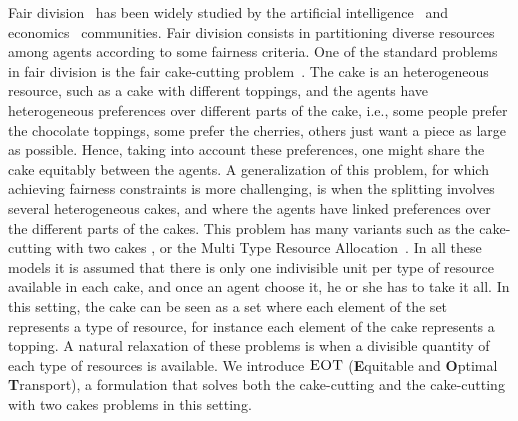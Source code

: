 Fair division~\citep{steinhaus1949fair} has been widely studied by the artificial intelligence~\citep{lattimore2015linear} and economics~\citep{moulin2004fair} communities. Fair division consists in partitioning diverse resources among agents according to some fairness criteria. One of the standard problems in fair division is the fair cake-cutting problem~\citep{dubins1961cut,brandt2016handbook}. The cake is an heterogeneous resource, such as a cake with different toppings, and the agents have heterogeneous preferences over different parts of the cake, i.e., some people prefer the chocolate toppings, some prefer the cherries, others just want a piece as large as possible. Hence, taking into account these preferences, one might share the cake equitably between the agents. A generalization of this problem, for which achieving fairness constraints is more challenging, is when the splitting involves several heterogeneous cakes, and where the agents have linked preferences over the different parts of the cakes. This problem has many variants such as the cake-cutting with two cakes \citep{cloutier2010two}, or the Multi Type Resource Allocation~\citep{mackin2015allocating,wang2019multi}. In all these models it is assumed that there is only one indivisible unit per type of resource available in each cake, and once an agent choose it, he or she has to take it all. In this setting, the cake can be seen as a set where each element of the set represents a type of resource, for instance each element of the cake represents a topping. A natural relaxation of these problems is when a divisible quantity of each type of resources is available.
We introduce $\textsc{EOT}$ (\textbf{E}quitable and \textbf{O}ptimal \textbf{T}ransport), a formulation that solves
both the cake-cutting and the cake-cutting with two cakes problems in this setting. 

